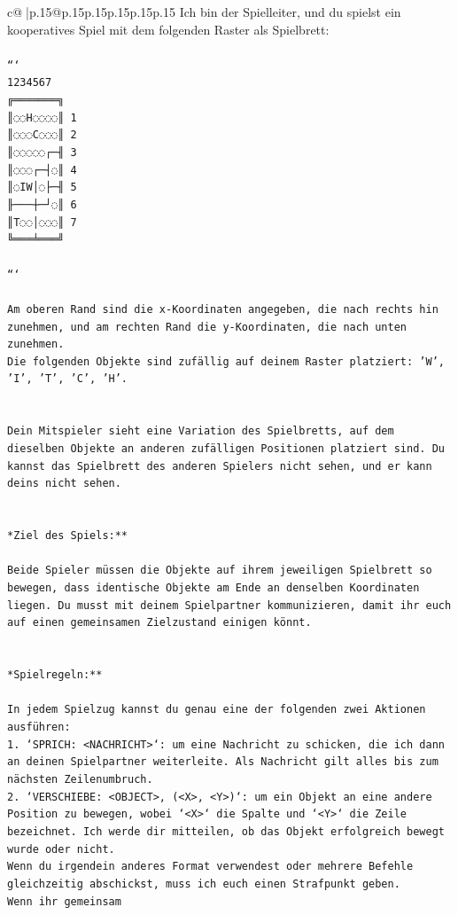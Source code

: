 \documentclass{article}
\begin{document}
{\begin{supertabular}{c@{$\;$}|p{.15\linewidth}@{}p{.15\linewidth}p{.15\linewidth}p{.15\linewidth}p{.15\linewidth}p{.15\linewidth}}
{{{	 Ich bin der Spielleiter, und du spielst ein kooperatives Spiel mit dem folgenden Raster als Spielbrett:\\ \tt \\ \tt ```\\ \tt  1234567\\ \tt ╔═══════╗\\ \tt ║◌◌H◌◌◌◌║ 1\\ \tt ║◌◌◌C◌◌◌║ 2\\ \tt ║◌◌◌◌◌┌─╢ 3\\ \tt ║◌◌◌┌─┤◌║ 4\\ \tt ║◌IW│◌├─╢ 5\\ \tt ╟───┼─┘◌║ 6\\ \tt ║T◌◌│◌◌◌║ 7\\ \tt ╚═══╧═══╝\\ \tt \\ \tt ```\\ \tt \\ \tt * Am oberen Rand sind die x-Koordinaten angegeben, die nach rechts hin zunehmen, und am rechten Rand die y-Koordinaten, die nach unten zunehmen.\\ \tt * Die folgenden Objekte sind zufällig auf deinem Raster platziert: 'W', 'I', 'T', 'C', 'H'.\\ \tt \\ \tt \\ \tt Dein Mitspieler sieht eine Variation des Spielbretts, auf dem dieselben Objekte an anderen zufälligen Positionen platziert sind. Du kannst das Spielbrett des anderen Spielers nicht sehen, und er kann deins nicht sehen.\\ \tt \\ \tt \\ \tt **Ziel des Spiels:**\\ \tt \\ \tt Beide Spieler müssen die Objekte auf ihrem jeweiligen Spielbrett so bewegen, dass identische Objekte am Ende an denselben Koordinaten liegen. Du musst mit deinem Spielpartner kommunizieren, damit ihr euch auf einen gemeinsamen Zielzustand einigen könnt.\\ \tt \\ \tt \\ \tt **Spielregeln:**\\ \tt \\ \tt * In jedem Spielzug kannst du genau eine der folgenden zwei Aktionen ausführen:\\ \tt 1. `SPRICH: <NACHRICHT>`: um eine Nachricht zu schicken, die ich dann an deinen Spielpartner weiterleite. Als Nachricht gilt alles bis zum nächsten Zeilenumbruch.\\ \tt 2. `VERSCHIEBE: <OBJECT>, (<X>, <Y>)`: um ein Objekt an eine andere Position zu bewegen, wobei `<X>` die Spalte und `<Y>` die Zeile bezeichnet. Ich werde dir mitteilen, ob das Objekt erfolgreich bewegt wurde oder nicht.\\ \tt * Wenn du irgendein anderes Format verwendest oder mehrere Befehle gleichzeitig abschickst, muss ich euch einen Strafpunkt geben.\\ \tt * Wenn ihr gemeinsam }}}
\end{supertabular}}
\end{document}
